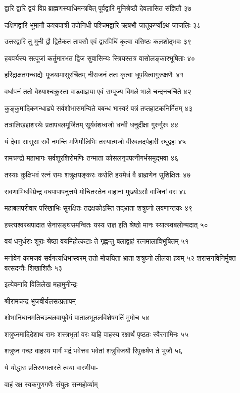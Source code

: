 द्वारि द्वारि द्वयं विप्र ब्राह्मणस्याधिमन्त्रवित्
पूर्वद्वारि मुनिश्रेष्ठौ देवलासित संज्ञितौ ३७

दक्षिणद्वारि भूमानौ कश्यपात्री तपोनिधी
पश्चिमद्वारि ऋषभौ जातूकर्ण्योऽथ जाजलिः ३८

उत्तरद्वारि तु मुनी द्वौ द्वितैकत तापसौ
एवं द्वारविधिं कृत्वा वसिष्ठः कलशोद्भवः ३९

हयवर्यस्य सत्पूजां कर्तुमारभत द्विज
सुवासिन्यः स्त्रियस्तत्र वासोलङ्कारभूषिताः ४०

हरिद्राक्षतगन्धाद्यैः पूजयामासुरर्चितम्
नीराजनं ततः कृत्वा धूपयित्वागुरूक्षणैः ४१

वर्धापनं ततो वेश्याश्चक्रुस्ता वाडवाज्ञया
एवं सम्पूज्य विमले भाले चन्दनचर्चिते ४२

कुङ्कुमादिकगन्धाढ्ये सर्वशोभासमन्विते
बबन्ध भास्वरं पत्रं तप्तहाटकनिर्मितम् ४३

तत्रालिखद्दाशरथेः प्रतापबलमूर्जितम्
सूर्यवंशध्वजो धन्वी धनुर्दीक्षा गुरुर्गुरुः ४४

यं देवाः सासुराः सर्वे नमन्ति मणिमौलिभिः
तस्यात्मजो वीरबलदर्पहारी रघूद्वहः ४५

रामचन्द्रो महाभागः सर्वशूरशिरोमणिः
तन्माता कोसलनृपपत्नीगर्भसमुद्भवा ४६

तस्याः कुक्षिभवं रत्नं रामः शत्रुक्षयङ्करः
करोति हयमेधं वै ब्राह्मणेन सुशिक्षितः ४७

रावणाभिधविप्रेन्द्र वधपापापनुत्तये
मोचितस्तेन वाहानां मुख्योऽसौ वाजिनां वरः ४८

महाबलपरीवार परिखाभिः सुरक्षितः
तद्रक्षकोऽस्ति तद्भ्राता शत्रुघ्नो लवणान्तकः ४९

हस्त्यश्वरथपादात सेनासङ्घसमन्वितः
यस्य राज्ञ इति श्रेष्ठो मानः स्यात्स्वबलोन्मदात् ५०

वयं धनुर्धराः शूराः श्रेष्ठा वयमिहोत्कटाः
ते गृह्णन्तु बलाद्वाहं रत्नमालाविभूषितम् ५१

मनोवेगं कामजवं सर्वगत्यधिभास्वरम्
ततो मोचयिता भ्राता शत्रुघ्नो लीलया हयम् ५२
शरासनविनिर्मुक्त वत्सदन्तैः शिखाशितैः ५३

इत्येवमादि विलिलेख महामुनीन्द्रः

श्रीरामचन्द्र भुजवीर्यलसत्प्रतापम्

शोभानिधानमतिचञ्चलवायुवेगं
पातालभूतलविशेषगतिं मुमोच ५४

शत्रुघ्नमादिदेशाथ रामः शस्त्रभृतां वरः
याहि वाहस्य रक्षार्थं पृष्ठतः स्वैरगामिनः ५५

शत्रुघ्न गच्छ वाहस्य मार्गं भद्रं भवेत्तव
भवेतां शत्रुविजयौ रिपुकर्षण ते भुजौ ५६

ये योद्धारः प्रतिरणगतास्ते त्वया वारणीया-

वाहं रक्ष स्वकगुणगणैः संयुतः सन्महोर्व्याम्

